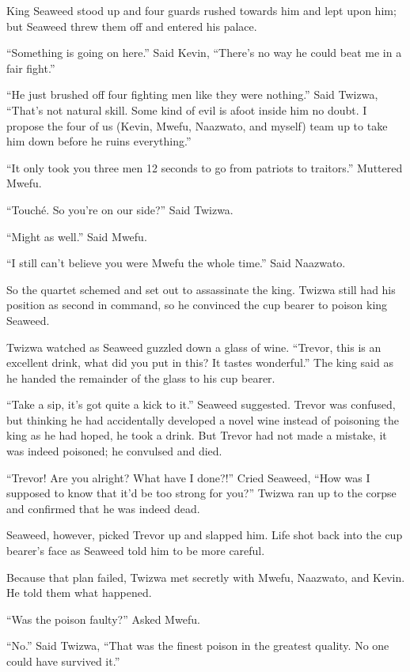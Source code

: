 King Seaweed stood up and four guards rushed towards him and lept upon him; but Seaweed threw them off and entered his palace.

``Something is going on here.'' Said Kevin, ``There's no way he could beat me in a fair fight.''

``He just brushed off four fighting men like they were nothing.'' Said Twizwa, ``That's not natural skill. Some kind of evil is afoot inside him no doubt. I propose the four of us (Kevin, Mwefu, Naazwato, and myself) team up to take him down before he ruins everything.''

``It only took you three men 12 seconds to go from patriots to traitors.'' Muttered Mwefu.

``Touch\'{e}. So you're on our side?'' Said Twizwa.

``Might as well.'' Said Mwefu.

``I still can't believe you were Mwefu the whole time.'' Said Naazwato.

\tbreak

So the quartet schemed and set out to assassinate the king.
Twizwa still had his position as second in command, so he convinced the cup bearer to poison king Seaweed.

\tbreak

Twizwa watched as Seaweed guzzled down a glass of wine. ``Trevor, this is an excellent drink, what did you put in this? It tastes wonderful.'' The king said as he handed the remainder of the glass to his cup bearer.

``Take a sip, it's got quite a kick to it.'' Seaweed suggested. Trevor was confused, but thinking he had accidentally developed a novel wine instead of poisoning the king as he had hoped, he took a drink. But Trevor had not made a mistake, it was indeed poisoned; he convulsed and died. 

``Trevor! Are you alright? What have I done?!'' Cried Seaweed, ``How was I supposed to know that it'd be too strong for you?'' Twizwa ran up to the corpse and confirmed that he was indeed dead.

Seaweed, however, picked Trevor up and slapped him. Life shot back into the cup bearer's face as Seaweed told him to be more careful. 

Because that plan failed, Twizwa met secretly with Mwefu, Naazwato, and Kevin. He told them what happened.

``Was the poison faulty?'' Asked Mwefu.

``No.'' Said Twizwa, ``That was the finest poison in the greatest quality. No one could have survived it.'' 


